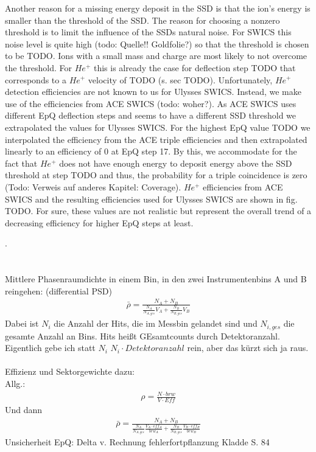 Another reason for a missing energy deposit in the SSD is that the ion's energy is smaller than the threshold of the SSD. The reason for choosing a nonzero threshold is to limit the influence of the SSDs natural noise. For SWICS this noise level is quite high (todo: Quelle!! Goldfolie?) so that the threshold is chosen to be TODO. Ions with a small mass and charge are most likely to not overcome the threshold. For $He^{+}$ this is already the case for deflection step TODO that corresponds to a $He^{+}$ velocity of TODO (s. sec TODO).
Unfortunately, $He^{+}$ detection efficiencies are not known to us for Ulysses SWICS. Instead, we make use of the efficiencies from ACE SWICS (todo: woher?). As ACE SWICS uses different EpQ deflection steps and seems to have a different SSD threshold we extrapolated the values for Ulysses SWICS.
For the highest EpQ value TODO we interpolated the efficiency from the ACE triple efficiencies and then extrapolated linearly to an efficiency of 0 at EpQ step 17. By this, we accommodate for the fact that $He^{+}$ does not have enough energy to deposit energy above the SSD threshold at step TODO and thus, the probability for a triple coincidence is zero (Todo: Verweis auf anderes Kapitel: Coverage). $He^{+}$ efficiencies from ACE SWICS and the resulting efficiencies used for Ulysses SWICS are shown in fig. TODO. For sure, these values are not realistic but represent the overall trend of a decreasing efficiency for higher EpQ steps at least.

.
\\ \\ \\
Mittlere Phasenraumdichte in einem Bin, in den zwei Instrumentenbins A und B reingehen:
(differential PSD)
\begin{align}
\bar{\rho} = \frac{N_A + N_B}{\frac{N_A}{N_{A,ges}} V_A + \frac{N_B}{N_{B,ges}} V_B }
\end{align}
Dabei ist $N_i$ die Anzahl der Hits, die im Messbin gelandet sind und $N_{i,ges}$ die gesamte Anzahl an Bins. Hits heißt GEsamtcounts durch Detektoranzahl. Eigentlich gebe ich statt $N_i$ $N_i \cdot Detektoranzahl$ rein, aber das kürzt sich ja raus.\\ \\
Effizienz und Sektorgewichte dazu:\\
Allg.:
\begin{align*}
\rho = \frac{N \cdot brw}{V \cdot Eff}
\end{align*}
Und dann
\begin{align}
\bar{\rho} = \frac{N_A + N_B}{\frac{N_A}{N_{A,ges}} \frac{V_A \cdot eff_A}{brw_A} + \frac{N_B}{N_{B,ges}} \frac{V_B \cdot eff_B}{brw_B} }
\end{align}
Unsicherheit EpQ: Delta v. Rechnung fehlerfortpflanzung Kladde S. 84


